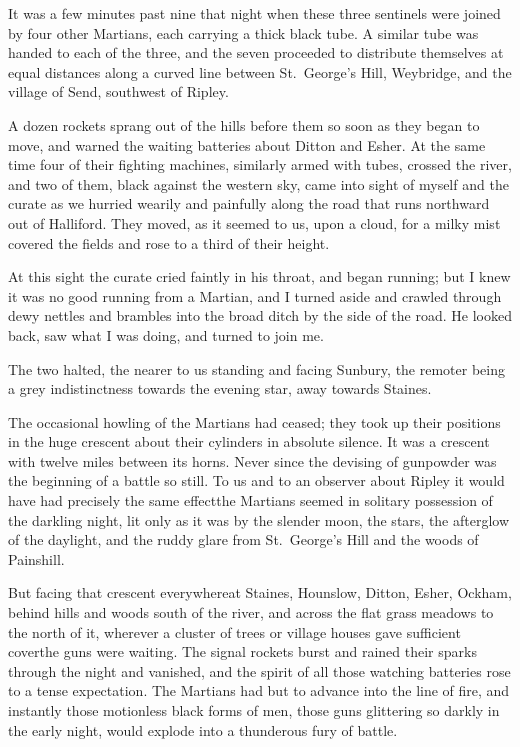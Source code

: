 It was a few minutes past nine that night when these three
sentinels were joined by four other Martians, each carrying a thick
black tube. A similar tube was handed to each of the three, and the
seven proceeded to distribute themselves at equal distances along a
curved line between St.\ George's Hill, Weybridge, and the village
of Send, southwest of Ripley.

A dozen rockets sprang out of the hills before them so soon as they
began to move, and warned the waiting batteries about Ditton and
Esher. At the same time four of their fighting machines, similarly
armed with tubes, crossed the river, and two of them, black against
the western sky, came into sight of myself and the curate as we
hurried wearily and painfully along the road that runs northward
out of Halliford. They moved, as it seemed to us, upon a cloud, for
a milky mist covered the fields and rose to a third of their
height.

At this sight the curate cried faintly in his throat, and began
running; but I knew it was no good running from a Martian, and I
turned aside and crawled through dewy nettles and brambles into the
broad ditch by the side of the road. He looked back, saw what I was
doing, and turned to join me.

The two halted, the nearer to us standing and facing Sunbury, the
remoter being a grey indistinctness towards the evening star, away
towards Staines.

The occasional howling of the Martians had ceased; they took up
their positions in the huge crescent about their cylinders in
absolute silence. It was a crescent with twelve miles between its
horns. Never since the devising of gunpowder was the beginning of a
battle so still. To us and to an observer about Ripley it would
have had precisely the same effect\dash{}the Martians seemed in solitary
possession of the darkling night, lit only as it was by the slender
moon, the stars, the afterglow of the daylight, and the ruddy glare
from St.\ George's Hill and the woods of Painshill.

But facing that crescent everywhere\dash{}at Staines, Hounslow, Ditton,
Esher, Ockham, behind hills and woods south of the river, and
across the flat grass meadows to the north of it, wherever a
cluster of trees or village houses gave sufficient cover\dash{}the guns
were waiting. The signal rockets burst and rained their sparks
through the night and vanished, and the spirit of all those
watching batteries rose to a tense expectation. The Martians had
but to advance into the line of fire, and instantly those
motionless black forms of men, those guns glittering so darkly in
the early night, would explode into a thunderous fury of battle.

